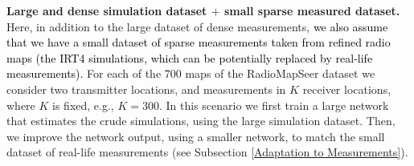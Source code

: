 \documentclass[10pt,a4paper]{article}
\begin{document}
\par{\noindent\textbf{Large and dense simulation dataset $+$ small sparse measured dataset.}} 
Here, in addition to the large dataset of dense measurements, \textcolor{black}{we also assume that we have a small dataset of sparse measurements taken from refined radio maps (the IRT4 simulations, which can be potentially replaced by real-life measurements).} 
For each of the 700 maps of the RadioMapSeer dataset we consider two transmitter locations, and measurements in $K$ receiver locations, where $K$ is fixed, e.g., $K=300$. %
In this scenario we first train a large network that estimates the crude simulations, using the large simulation dataset. Then, we improve the network output, using a smaller network, to match the small dataset of real-life measurements (see Subsection \ref{Adaptation to Measurements}). %

%
%
%
%
%
\end{document}
